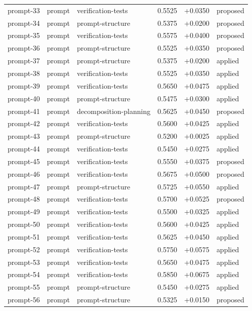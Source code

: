 \begin{center}
\begin{longtable}{llp{5.2cm}rrl}
prompt-33 & prompt & verification-tests & 0.5525 & +0.0350 & proposed \\
prompt-34 & prompt & prompt-structure & 0.5375 & +0.0200 & proposed \\
prompt-35 & prompt & verification-tests & 0.5575 & +0.0400 & proposed \\
prompt-36 & prompt & prompt-structure & 0.5525 & +0.0350 & proposed \\
prompt-37 & prompt & prompt-structure & 0.5375 & +0.0200 & applied \\
prompt-38 & prompt & verification-tests & 0.5525 & +0.0350 & applied \\
prompt-39 & prompt & verification-tests & 0.5650 & +0.0475 & applied \\
prompt-40 & prompt & prompt-structure & 0.5475 & +0.0300 & applied \\
prompt-41 & prompt & decomposition-planning & 0.5625 & +0.0450 & proposed \\
prompt-42 & prompt & verification-tests & 0.5600 & +0.0425 & applied \\
prompt-43 & prompt & prompt-structure & 0.5200 & +0.0025 & applied \\
prompt-44 & prompt & verification-tests & 0.5450 & +0.0275 & applied \\
prompt-45 & prompt & verification-tests & 0.5550 & +0.0375 & proposed \\
prompt-46 & prompt & verification-tests & 0.5675 & +0.0500 & proposed \\
prompt-47 & prompt & prompt-structure & 0.5725 & +0.0550 & applied \\
prompt-48 & prompt & verification-tests & 0.5700 & +0.0525 & proposed \\
prompt-49 & prompt & verification-tests & 0.5500 & +0.0325 & applied \\
prompt-50 & prompt & verification-tests & 0.5600 & +0.0425 & applied \\
prompt-51 & prompt & verification-tests & 0.5625 & +0.0450 & applied \\
prompt-52 & prompt & verification-tests & 0.5750 & +0.0575 & applied \\
prompt-53 & prompt & verification-tests & 0.5650 & +0.0475 & applied \\
prompt-54 & prompt & verification-tests & 0.5850 & +0.0675 & applied \\
prompt-55 & prompt & prompt-structure & 0.5450 & +0.0275 & applied \\
prompt-56 & prompt & prompt-structure & 0.5325 & +0.0150 & proposed \\

\end{longtable}
\end{center}
